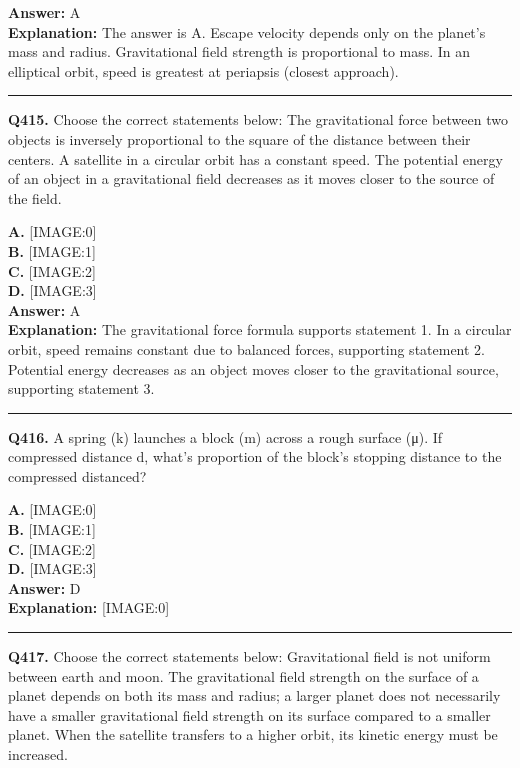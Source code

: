 \documentclass[12pt]{article}
\begin{document}
\textbf{Answer:} A \\
\textbf{Explanation:} The answer is A. Escape velocity depends only on the planet's mass and radius. Gravitational field strength is proportional to mass. In an elliptical orbit, speed is greatest at periapsis (closest approach).

\hrule
\vspace{1em}


\noindent
\textbf{Q415.} Choose the correct statements below:
The gravitational force between two objects is inversely proportional to the square of the distance between their centers.
A satellite in a circular orbit has a constant speed.
The potential energy of an object in a gravitational field decreases as it moves closer to the source of the field.



\textbf{A.} [IMAGE:0] \\
\textbf{B.} [IMAGE:1] \\
\textbf{C.} [IMAGE:2] \\
\textbf{D.} [IMAGE:3] \\

\textbf{Answer:} A \\
\textbf{Explanation:} The gravitational force formula supports statement 1. In a circular orbit, speed remains constant due to balanced forces, supporting statement 2. Potential energy decreases as an object moves closer to the gravitational source, supporting statement 3.

\hrule
\vspace{1em}


\noindent
\textbf{Q416.} A spring (k) launches a block (m) across a rough surface (μ). If compressed distance d, what's proportion of the block's stopping distance to the compressed distanced?



\textbf{A.} [IMAGE:0] \\
\textbf{B.} [IMAGE:1] \\
\textbf{C.} [IMAGE:2] \\
\textbf{D.} [IMAGE:3] \\

\textbf{Answer:} D \\
\textbf{Explanation:} [IMAGE:0]

\hrule
\vspace{1em}


\noindent
\textbf{Q417.} Choose the correct statements below:
Gravitational field is not uniform between earth and moon.
The gravitational field strength on the surface of a planet depends on both its mass and radius; a larger planet does not necessarily have a smaller gravitational field strength on its surface compared to a smaller planet.
When the satellite transfers to a higher orbit, its kinetic energy must be increased.
\end{document}
